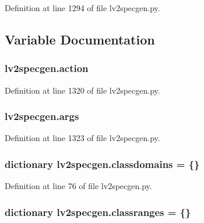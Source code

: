 Definition at line 1294 of file lv2specgen.\+py.



\subsection{Variable Documentation}
\subsubsection[{\texorpdfstring{action}{action}}]{\setlength{\rightskip}{0pt plus 5cm}lv2specgen.\+action}\hypertarget{namespacelv2specgen_a7dac92a6e76f9cbfb25e902b88b09867}{}\label{namespacelv2specgen_a7dac92a6e76f9cbfb25e902b88b09867}


Definition at line 1320 of file lv2specgen.\+py.

\subsubsection[{\texorpdfstring{args}{args}}]{\setlength{\rightskip}{0pt plus 5cm}lv2specgen.\+args}\hypertarget{namespacelv2specgen_a022f620722f1029244a92eca556aa50a}{}\label{namespacelv2specgen_a022f620722f1029244a92eca556aa50a}


Definition at line 1323 of file lv2specgen.\+py.

\subsubsection[{\texorpdfstring{classdomains}{classdomains}}]{\setlength{\rightskip}{0pt plus 5cm}dictionary lv2specgen.\+classdomains = \{\}}\hypertarget{namespacelv2specgen_a2f81c0f02309f314c1d089f3d0d9b483}{}\label{namespacelv2specgen_a2f81c0f02309f314c1d089f3d0d9b483}


Definition at line 76 of file lv2specgen.\+py.

\subsubsection[{\texorpdfstring{classranges}{classranges}}]{\setlength{\rightskip}{0pt plus 5cm}dictionary lv2specgen.\+classranges = \{\}}\hypertarget{namespacelv2specgen_a14a02895b5a9f168be8f2bcbfc786691}{}\label{namespacelv2specgen_a14a02895b5a9f168be8f2bcbfc786691}


